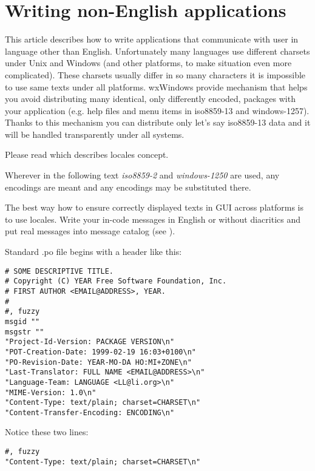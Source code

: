 \section{Writing non-English applications}\label{nonenglishoverview}

This article describes how to write applications that communicate with
user in language other than English. Unfortunately many languages use
different charsets under Unix and Windows (and other platforms, to make
situation even more complicated). These charsets usually differ in so
many characters it is impossible to use same texts under all platforms.
wxWindows provide mechanism that helps you avoid distributing many
identical, only differently encoded, packages with your application 
(e.g. help files and menu items in iso8859-13 and windows-1257). Thanks
to this mechanism you can distribute only let's say iso8859-13 data 
and it will be handled transparently under all systems.

Please read  which
describes locales concept.

Wherever in the following text {\it iso8859-2} and {\it windows-1250} are
used, any encodings are meant and any encodings may be substituted there.


The best way how to ensure correctly displayed texts in GUI across platforms
is to use locales. Write your in-code messages in English or without 
diacritics and put real messages into message catalog (see 
).

Standard .po file begins with a header like this:

\begin{verbatim}
# SOME DESCRIPTIVE TITLE.
# Copyright (C) YEAR Free Software Foundation, Inc.
# FIRST AUTHOR <EMAIL@ADDRESS>, YEAR.
#
#, fuzzy
msgid ""
msgstr ""
"Project-Id-Version: PACKAGE VERSION\n"
"POT-Creation-Date: 1999-02-19 16:03+0100\n"
"PO-Revision-Date: YEAR-MO-DA HO:MI+ZONE\n"
"Last-Translator: FULL NAME <EMAIL@ADDRESS>\n"
"Language-Team: LANGUAGE <LL@li.org>\n"
"MIME-Version: 1.0\n"
"Content-Type: text/plain; charset=CHARSET\n"
"Content-Transfer-Encoding: ENCODING\n"
\end{verbatim}

Notice these two lines:

\begin{verbatim}
#, fuzzy
"Content-Type: text/plain; charset=CHARSET\n"
\end{verbatim}

